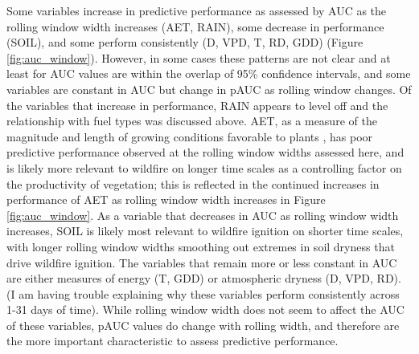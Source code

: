 \documentclass[11p]{article}
\begin{document}
Some variables increase in predictive performance as assessed by AUC as the rolling window width increases (AET, RAIN), some decrease in performance (SOIL), and some perform consistently (D, VPD, T, RD, GDD) (Figure \ref{fig:auc_window}). However, in some cases these patterns are not clear and at least for AUC values are within the overlap of 95\% confidence intervals, and some variables are constant in AUC but change in pAUC as rolling window changes. Of the variables that increase in performance, RAIN appears to level off and the relationship with fuel types was discussed above. AET, as a measure of the magnitude and length of growing conditions favorable to plants \citep{stephensonActualEvapotranspirationDeficit1998}, has poor predictive performance observed at the rolling window widths assessed here, and is likely more relevant to wildfire on longer time scales as a controlling factor on the productivity of vegetation; this is reflected in the continued increases in performance of AET as rolling window width increases in Figure \ref{fig:auc_window}. As a variable that decreases in AUC as rolling window width increases, SOIL is likely most relevant to wildfire ignition on shorter time scales, with longer rolling window widths smoothing out extremes in soil dryness that drive wildfire ignition. The variables that remain more or less constant in AUC are either measures of energy (T, GDD) or atmospheric dryness (D, VPD, RD). (I am having trouble explaining why these variables perform consistently across 1-31 days of time). While rolling window width does not seem to affect the AUC of these variables, pAUC values do change with rolling width, and therefore are the more important characteristic to assess predictive performance.

\end{document}
